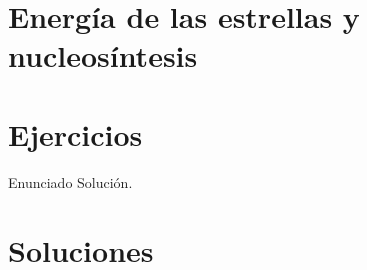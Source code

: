 
\section{Energía de las estrellas y nucleosíntesis}





\newpage





\section{Ejercicios}

\tcbstartrecording
\begin{texercise}
	Enunciado
	\tcblower 
    Solución.
\end{texercise}

\tcbstoprecording

\section{{Soluciones}}

\tcbinputrecords